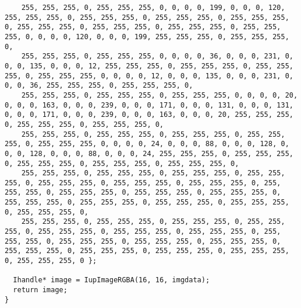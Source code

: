\documentclass{ctexart}
\begin{document}
\begin{lstlisting}
    255, 255, 255, 0, 255, 255, 255, 0, 0, 0, 0, 199, 0, 0, 0, 120, 255, 255, 255, 0, 255, 255, 255, 0, 255, 255, 255, 0, 255, 255, 255, 0, 255, 255, 255, 0, 255, 255, 255, 0, 255, 255, 255, 0, 255, 255, 255, 0, 0, 0, 0, 120, 0, 0, 0, 199, 255, 255, 255, 0, 255, 255, 255, 0,
    255, 255, 255, 0, 255, 255, 255, 0, 0, 0, 0, 36, 0, 0, 0, 231, 0, 0, 0, 135, 0, 0, 0, 12, 255, 255, 255, 0, 255, 255, 255, 0, 255, 255, 255, 0, 255, 255, 255, 0, 0, 0, 0, 12, 0, 0, 0, 135, 0, 0, 0, 231, 0, 0, 0, 36, 255, 255, 255, 0, 255, 255, 255, 0,
    255, 255, 255, 0, 255, 255, 255, 0, 255, 255, 255, 0, 0, 0, 0, 20, 0, 0, 0, 163, 0, 0, 0, 239, 0, 0, 0, 171, 0, 0, 0, 131, 0, 0, 0, 131, 0, 0, 0, 171, 0, 0, 0, 239, 0, 0, 0, 163, 0, 0, 0, 20, 255, 255, 255, 0, 255, 255, 255, 0, 255, 255, 255, 0,
    255, 255, 255, 0, 255, 255, 255, 0, 255, 255, 255, 0, 255, 255, 255, 0, 255, 255, 255, 0, 0, 0, 0, 24, 0, 0, 0, 88, 0, 0, 0, 128, 0, 0, 0, 128, 0, 0, 0, 88, 0, 0, 0, 24, 255, 255, 255, 0, 255, 255, 255, 0, 255, 255, 255, 0, 255, 255, 255, 0, 255, 255, 255, 0,
    255, 255, 255, 0, 255, 255, 255, 0, 255, 255, 255, 0, 255, 255, 255, 0, 255, 255, 255, 0, 255, 255, 255, 0, 255, 255, 255, 0, 255, 255, 255, 0, 255, 255, 255, 0, 255, 255, 255, 0, 255, 255, 255, 0, 255, 255, 255, 0, 255, 255, 255, 0, 255, 255, 255, 0, 255, 255, 255, 0, 255, 255, 255, 0,
    255, 255, 255, 0, 255, 255, 255, 0, 255, 255, 255, 0, 255, 255, 255, 0, 255, 255, 255, 0, 255, 255, 255, 0, 255, 255, 255, 0, 255, 255, 255, 0, 255, 255, 255, 0, 255, 255, 255, 0, 255, 255, 255, 0, 255, 255, 255, 0, 255, 255, 255, 0, 255, 255, 255, 0, 255, 255, 255, 0, 255, 255, 255, 0 };

  Ihandle* image = IupImageRGBA(16, 16, imgdata);
  return image;
}


\end{lstlisting}
\end{document}

